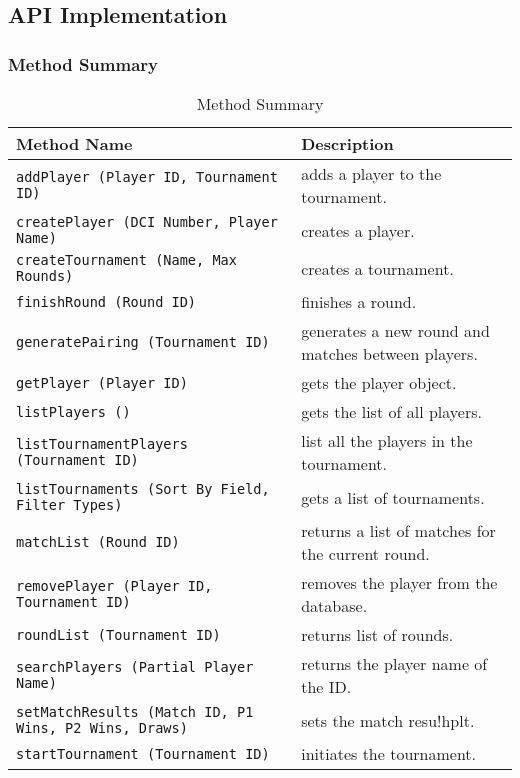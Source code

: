 \documentclass[11pt]{article}
\begin{document}
    \subsection {API Implementation}
    \subsubsection{Method Summary}
        \begin{table*}[!hp]
            \centering
            \begin{tabulary}{0.9\textwidth}{|p{28em}|p{17em}|}
                \hline
                \textbf{Method Name} & \textbf{Description}\\
                \hline
                \texttt{addPlayer (Player ID, Tournament ID)} & adds a player to the tournament.\\
                \hline
                \texttt{createPlayer (DCI Number, Player Name)} & creates a player.\\
                \hline
                \texttt{createTournament (Name, Max Rounds)} & creates a tournament.\\
                \hline
                \texttt{finishRound (Round ID)} & finishes a round.\\
                \hline
                \texttt{generatePairing (Tournament ID)} & generates a new round and matches between players.\\
                \hline
                \texttt{getPlayer (Player ID)} & gets the player object.\\
                \hline
                \texttt{listPlayers ()} & gets the list of all players.\\
                \hline
                \texttt{listTournamentPlayers (Tournament ID)} & list all the players in the tournament.\\
                \hline
                \texttt{listTournaments (Sort By Field, Filter Types)} & gets a list of tournaments.\\
                \hline
                \texttt{matchList (Round ID)} & returns a list of matches for the current round.\\
                \hline
                \texttt{removePlayer (Player ID, Tournament ID)} & removes the player from the database.\\
                \hline
                \texttt{roundList (Tournament ID)} & returns list of rounds.\\
                \hline
                \texttt{searchPlayers (Partial Player Name)} & returns the player name of the ID.\\
                \hline
                \texttt{setMatchResults (Match ID, P1 Wins, P2 Wins, Draws)} & sets the match resu!hplt.\\
                \hline
                \texttt{startTournament (Tournament ID)} & initiates the tournament.\\
                \hline
            \end{tabulary}
            \caption{Method Summary}
        \end{table*}
\end{document}
